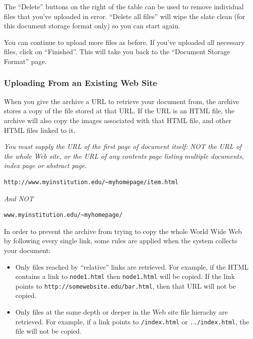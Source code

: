 The ``Delete'' buttons on the right of the table can be used to remove individual files that you've uploaded in error. ``Delete all files'' will wipe the slate clean (for this document storage format only) so you can start again.

You can continue to upload more files as before. If you've uploaded all necessary files, click on ``Finished''. This will take you back to the ``Document Storage Format'' page.


\subsubsection{Uploading From an Existing Web Site}

When you give the archive a URL to retrieve your document from, the archive stores a copy of the file stored at that URL. If the URL is an HTML file, the archive will also copy the images associated with that HTML file, and other HTML files linked to it.

\emph{You must supply the URL of the first page of document itself: NOT the URL of the whole Web site, or the URL of any contents page listing multiple documents, index page or abstract page.}

\begin{verbatim}
http://www.myinstitution.edu/~myhomepage/item.html
\end{verbatim}

\emph{And NOT}

\begin{verbatim}
www.myinstitution.edu/~myhomepage/
\end{verbatim}

In order to prevent the archive from trying to copy the whole World Wide Web by following every single link, some rules are applied when the system collects your document:

\begin{itemize}
\item Only files reached by ``relative'' links are retrieved. For example, if the HTML contains a link to {\tt node1.html} then {\tt node1.html} will be copied. If the link points to {\tt http://somewebsite.edu/bar.html}, then that URL will not be copied.
\item Only files at the same depth or deeper in the Web site file hierachy are retrieved. For example, if a link points to {\tt /index.html} or {\tt ../index.html}, the file will not be copied.
\end{itemize}

